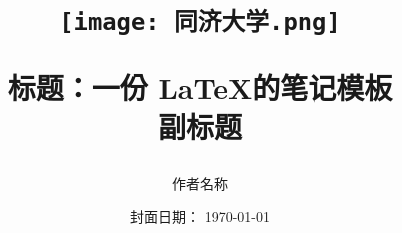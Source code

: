 
\def\myTitle{标题：一份 \LaTeX 的笔记模板}
\def\myAuthor{作者名称}
\def\myDateCover{封面日期： \today}
\def\mySubheading{副标题}

\title{
    \begin{figure}
        \centering
        \texttt{[image: 同济大学.png]}
    \end{figure}
{\Huge{\textbf{\myTitle}}} \\ \mySubheading
}
\author{\myAuthor}
\date{\myDateCover}
\maketitle






